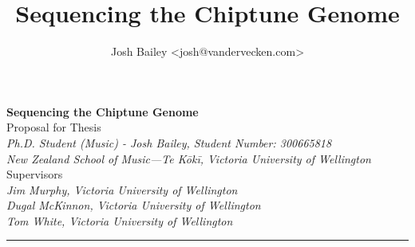 \documentclass[10pt]{article}
\author{Josh Bailey <josh@vandervecken.com>}
\title{Sequencing the Chiptune Genome}
\begin{document}
        \begin{center}
          {\Large \textbf{Sequencing the Chiptune Genome}}\\
                \vspace{1em}
                Proposal for Thesis\\
                \vspace{1em}
                \textit{
                Ph.D. Student (Music) - Josh Bailey,
                Student Number: 300665818\\
                  New Zealand School of Music—Te Kōkī,
                  Victoria University of Wellington}\\
                \vspace{1em}
                Supervisors\\
                \vspace{1em}
                \textit{
                  Jim Murphy, Victoria University of Wellington\\
                  Dugal McKinnon, Victoria University of Wellington\\
                  Tom White, Victoria University of Wellington}\\
        \end{center}

        \begin{center}
                \rule{150mm}{0.2mm}
        \end{center}
\end{document}
